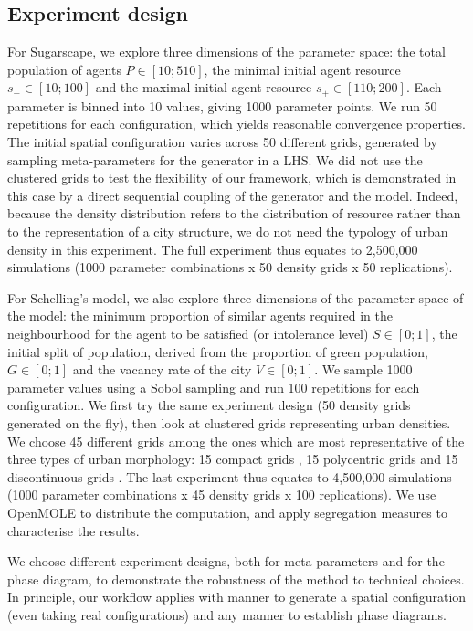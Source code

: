 \documentclass[3p,times,procedia]{elsarticle}
\begin{document}
\subsection{Experiment design}
For Sugarscape, we explore three dimensions of the parameter space: the total population of agents $P\in \left[10;510\right]$, the minimal initial agent resource $s_{-}\in \left[10;100\right]$ and the maximal initial agent resource $s_{+}\in \left[110;200\right]$. Each parameter is binned into 10 values, giving 1000 parameter points. We run 50 repetitions for each configuration, which yields reasonable convergence properties. The initial spatial configuration varies across 50 different grids, generated by sampling meta-parameters for the generator in a LHS. We did not use the clustered grids to test the flexibility of our framework, which is demonstrated in this case by a direct sequential coupling of the generator and the model. Indeed, because the density distribution refers to the distribution of resource rather than to the representation of a city structure, we do not need the typology of urban density in this experiment. The full experiment thus equates to 2,500,000 simulations (1000 parameter combinations x 50 density grids x 50 replications). 

For Schelling's model, we also explore three dimensions of the parameter space of the model: the minimum proportion of similar agents required in the neighbourhood for the agent to be satisfied (or intolerance level) $S\in \left[0;1\right]$, the initial split of population, derived from the proportion of green population, $G\in \left[0;1\right]$ and the vacancy rate of the city $V\in \left[0;1\right]$. We sample 1000 parameter values using a Sobol sampling and run 100 repetitions for each configuration. We first try the same experiment design (50 density grids generated on the fly), then look at clustered grids representing urban densities. We choose 45 different grids among the ones which are most representative of the three types of urban morphology: 15 compact grids , 15 polycentric grids  and 15 discontinuous grids . The last experiment thus equates to 4,500,000 simulations (1000 parameter combinations x 45 density grids x 100 replications). We use OpenMOLE to distribute the computation, and apply segregation measures to characterise the results.



We choose different experiment designs, both for meta-parameters and for the phase diagram, to demonstrate the robustness of the method to technical choices. In principle, our workflow applies with  manner to generate a spatial configuration (even taking real configurations) and any manner to establish phase diagrams.
\end{document}
